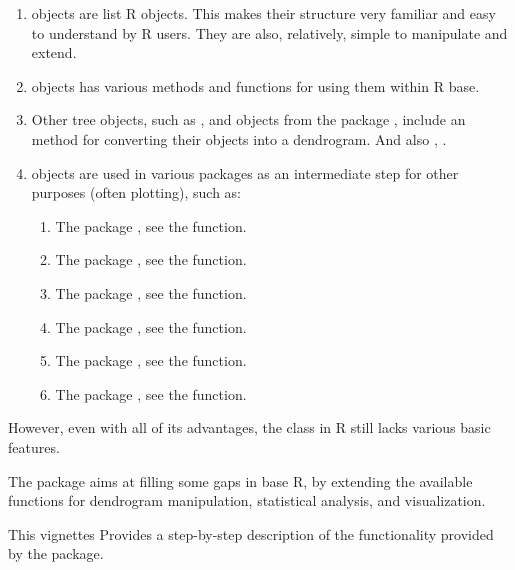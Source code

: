 \documentclass[shortnames,nojss,article]{jss}\usepackage{graphicx, color}
\begin{document}
\begin{enumerate}

   \item {} objects are list R objects. This makes their structure very familiar and easy to understand by R users. They are also, relatively, simple to manipulate and extend.
   \item {} objects has various methods and functions for using them within R base. 
   \item Other tree objects, such as , and objects from the  package \citep{CRAN:ape},  include an  method for converting their objects into a dendrogram. And also , .
   \item {} objects are used in various packages as an intermediate step for other purposes (often plotting), such as:
   
   \begin{enumerate}
   \item The  package \citep{CRAN:latticeExtra}, see the  function.
   \item The  package \citep{CRAN:labeltodendro}, see the  function.
   \item The  package \citep{CRAN:bclust}, see the  function.
   \item The  package \citep{CRAN:ggdendro}, see the  function.
   \item The  package \citep{CRAN:Heatplus}, see the  function.
   \item The  package \citep{CRAN:Heatplus}, see the  function.
   \end{enumerate}
   
\end{enumerate}
   


However, even with all of its advantages, the  class in R still lacks various basic features.

The  package aims at filling some gaps in base R, by extending the available functions for dendrogram manipulation, statistical analysis, and visualization.

This vignettes Provides a step-by-step description of the functionality provided by the  package.
\end{document}
